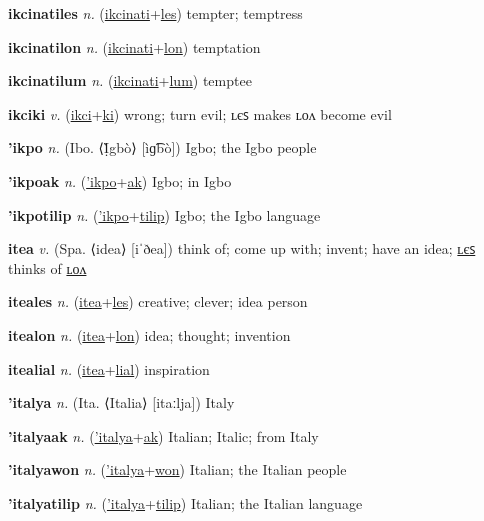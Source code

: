 \textbf{\hypertarget{ikcinatiles}{ikcinatiles}} \textit{n.} (\hyperlink{ikcinati}{ikcinati}+\allowbreak \hyperlink{les}{les})
tempter; temptress

\textbf{\hypertarget{ikcinatilon}{ikcinatilon}} \textit{n.} (\hyperlink{ikcinati}{ikcinati}+\allowbreak \hyperlink{lon}{lon})
temptation

\textbf{\hypertarget{ikcinatilum}{ikcinatilum}} \textit{n.} (\hyperlink{ikcinati}{ikcinati}+\allowbreak \hyperlink{lum}{lum})
temptee

\textbf{\hypertarget{ikciki}{ikciki}} \textit{v.} (\hyperlink{ikci}{ikci}+\allowbreak \hyperlink{ki}{ki})
wrong; turn evil; ʟєꜱ makes ʟᴏᴧ become evil

\textbf{\hypertarget{'ikpo}{'ikpo}} \textit{n.} (Ibo. ⟨Ị̀gbò⟩ [ìɡ͡bò])
Igbo; the Igbo people

\textbf{\hypertarget{'ikpoak}{'ikpoak}} \textit{n.} (\hyperlink{'ikpo}{'ikpo}+\allowbreak \hyperlink{ak}{ak})
Igbo; in Igbo

\textbf{\hypertarget{'ikpotilip}{'ikpotilip}} \textit{n.} (\hyperlink{'ikpo}{'ikpo}+\allowbreak \hyperlink{tilip}{tilip})
Igbo; the Igbo language

\textbf{\hypertarget{itea}{itea}} \textit{v.} (Spa. ⟨idea⟩ [iˈðea])
think of; come up with; invent; have an idea; \hyperlink{iteales}{ʟєꜱ} thinks of \hyperlink{itealon}{ʟᴏᴧ}

\textbf{\hypertarget{iteales}{iteales}} \textit{n.} (\hyperlink{itea}{itea}+\allowbreak \hyperlink{les}{les})
creative; clever; idea person

\textbf{\hypertarget{itealon}{itealon}} \textit{n.} (\hyperlink{itea}{itea}+\allowbreak \hyperlink{lon}{lon})
idea; thought; invention

\textbf{\hypertarget{itealial}{itealial}} \textit{n.} (\hyperlink{itea}{itea}+\allowbreak \hyperlink{lial}{lial})
inspiration

\textbf{\hypertarget{'italya}{'italya}} \textit{n.} (Ita. ⟨Italia⟩ [itaːlja])
Italy

\textbf{\hypertarget{'italyaak}{'italyaak}} \textit{n.} (\hyperlink{'italya}{'italya}+\allowbreak \hyperlink{ak}{ak})
Italian; Italic; from Italy

\textbf{\hypertarget{'italyawon}{'italyawon}} \textit{n.} (\hyperlink{'italya}{'italya}+\allowbreak \hyperlink{won}{won})
Italian; the Italian people

\textbf{\hypertarget{'italyatilip}{'italyatilip}} \textit{n.} (\hyperlink{'italya}{'italya}+\allowbreak \hyperlink{tilip}{tilip})
Italian; the Italian language

